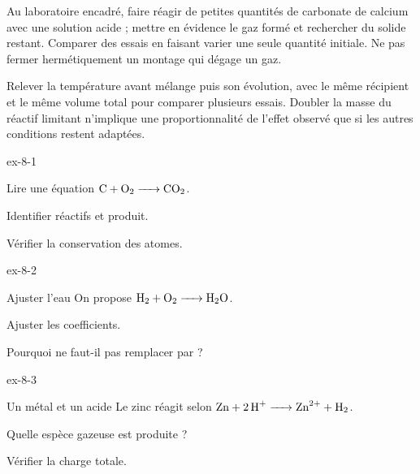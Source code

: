 \begin{experience}Au laboratoire encadré, faire réagir de petites quantités de carbonate de calcium avec une solution acide ; mettre en évidence le gaz formé et rechercher du solide restant. Comparer des essais en faisant varier une seule quantité initiale. Ne pas fermer hermétiquement un montage qui dégage un gaz.\end{experience}
\begin{experience}Relever la température avant mélange puis son évolution, avec le même récipient et le même volume total pour comparer plusieurs essais. Doubler la masse du réactif limitant n'implique une proportionnalité de l'effet observé que si les autres conditions restent adaptées.\end{experience}
\exercices
{}
\begin{blocLivre}{ex-8-1}\begin{exercice}[1]{Lire une équation}
$\ce{C + O2 -> CO2}$.
\begin{questions}
\item Identifier réactifs et produit.
\item Vérifier la conservation des atomes.
\end{questions}
\end{exercice}\end{blocLivre}
\begin{blocLivre}{ex-8-2}\begin{exercice}[1]{Ajuster l’eau}
On propose $\ce{H2 + O2 -> H2O}$.
\begin{questions}
\item Ajuster les coefficients.
\item Pourquoi ne faut-il pas remplacer  par  ?
\end{questions}
\end{exercice}\end{blocLivre}
\begin{blocLivre}{ex-8-3}\begin{exercice}[1]{Un métal et un acide}
Le zinc réagit selon $\ce{Zn + 2 H+ -> Zn^{2+} + H2}$.
\begin{questions}
\item Quelle espèce gazeuse est produite ?
\item Vérifier la charge totale.
\end{questions}
\end{exercice}\end{blocLivre}
